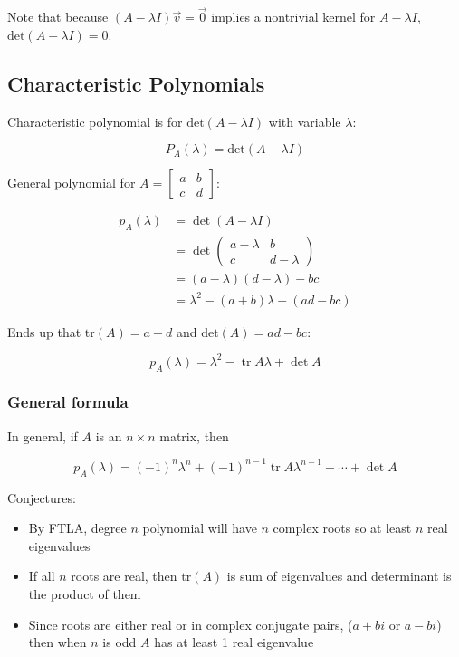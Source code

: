 Note that because $(A-\lambda I)\vec{v}=\vec{0}$ implies a nontrivial kernel for $A-\lambda I$, $\mathrm{det}(A-\lambda I)=0$.

\subsection{Characteristic Polynomials}

Characteristic polynomial is for $\mathrm{det}(A-\lambda I)$ with variable $\lambda$: 

\[\boxed{P_A(\lambda)=\mathrm{det}(A-\lambda I)}\]

General polynomial for $A=\begin{bmatrix}a&b\\c&d\end{bmatrix}$:

\[
    \begin{aligned}
        p_{A}(\lambda) &=\operatorname{det}(A-\lambda I) \\
        &=\operatorname{det}\left(\begin{array}{cc}
        a-\lambda & b \\
        c & d-\lambda
        \end{array}\right) \\
        &=(a-\lambda)(d-\lambda)-b c \\
        &=\lambda^{2}-(a+b) \lambda+(a d-b c)    
    \end{aligned}
\]

Ends up that $\mathrm{tr}(A)=a+d$ and $\mathrm{det}(A)=ad-bc$:

\[\boxed{p_{A}(\lambda)=\lambda^{2}-\operatorname{tr} A \lambda+\operatorname{det} A}\]

\subsubsection{General formula}

In general, if $A$ is an $n\times n$ matrix, then

\[\boxed{p_{A}(\lambda)=(-1)^{n} \lambda^{n}+(-1)^{n-1} \operatorname{tr} A \lambda^{n-1}+\cdots+\operatorname{det} A}\]

Conjectures:
\begin{itemize}
    \item By FTLA, degree $n$ polynomial will have $n$ complex roots so at least $n$ real eigenvalues
    \item If all $n$ roots are real, then $\mathrm{tr}(A)$ is sum of eigenvalues and determinant is the product of them
    \item Since roots are either real or in complex conjugate pairs, ($a+bi$ or $a-bi$) then when $n$ is odd $A$ has at least 1 real eigenvalue
\end{itemize}